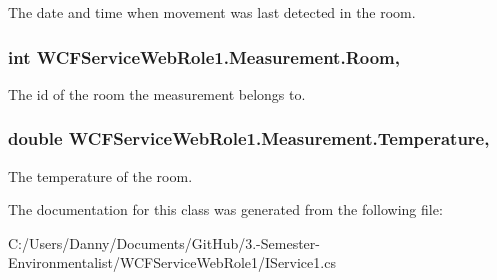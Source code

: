 The date and time when movement was last detected in the room. 

\hypertarget{class_w_c_f_service_web_role1_1_1_measurement_a37bf0a9d6b3b2aecd532a4de45cc2076}{}
\subsubsection[{Room}]{\setlength{\rightskip}{0pt plus 5cm}int W\+C\+F\+Service\+Web\+Role1.\+Measurement.\+Room\hspace{0.3cm}{\ttfamily [get]}, {\ttfamily [set]}}\label{class_w_c_f_service_web_role1_1_1_measurement_a37bf0a9d6b3b2aecd532a4de45cc2076}


The id of the room the measurement belongs to. 

\hypertarget{class_w_c_f_service_web_role1_1_1_measurement_a27481694219bde22fd509f9ada61fce6}{}
\subsubsection[{Temperature}]{\setlength{\rightskip}{0pt plus 5cm}double W\+C\+F\+Service\+Web\+Role1.\+Measurement.\+Temperature\hspace{0.3cm}{\ttfamily [get]}, {\ttfamily [set]}}\label{class_w_c_f_service_web_role1_1_1_measurement_a27481694219bde22fd509f9ada61fce6}


The temperature of the room. 



The documentation for this class was generated from the following file\+:\begin{DoxyCompactItemize}
\item 
C\+:/\+Users/\+Danny/\+Documents/\+Git\+Hub/3.-\/\+Semester-\/\+Environmentalist/\+W\+C\+F\+Service\+Web\+Role1/I\+Service1.\+cs\end{DoxyCompactItemize}
